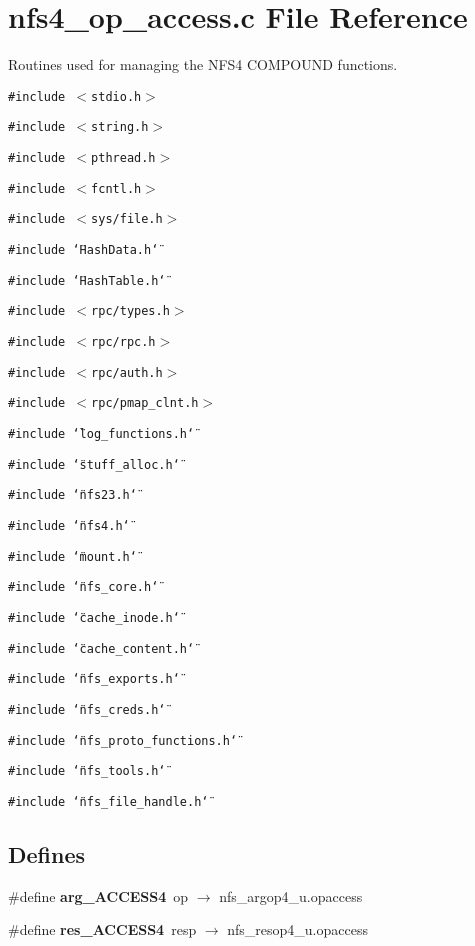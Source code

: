 \section{nfs4\_\-op\_\-access.c File Reference}
\label{nfs4__op__access_8c}
Routines used for managing the NFS4 COMPOUND functions. 

{\tt \#include $<$stdio.h$>$}\par
{\tt \#include $<$string.h$>$}\par
{\tt \#include $<$pthread.h$>$}\par
{\tt \#include $<$fcntl.h$>$}\par
{\tt \#include $<$sys/file.h$>$}\par
{\tt \#include \char`\"{}Hash\-Data.h\char`\"{}}\par
{\tt \#include \char`\"{}Hash\-Table.h\char`\"{}}\par
{\tt \#include $<$rpc/types.h$>$}\par
{\tt \#include $<$rpc/rpc.h$>$}\par
{\tt \#include $<$rpc/auth.h$>$}\par
{\tt \#include $<$rpc/pmap\_\-clnt.h$>$}\par
{\tt \#include \char`\"{}log\_\-functions.h\char`\"{}}\par
{\tt \#include \char`\"{}stuff\_\-alloc.h\char`\"{}}\par
{\tt \#include \char`\"{}nfs23.h\char`\"{}}\par
{\tt \#include \char`\"{}nfs4.h\char`\"{}}\par
{\tt \#include \char`\"{}mount.h\char`\"{}}\par
{\tt \#include \char`\"{}nfs\_\-core.h\char`\"{}}\par
{\tt \#include \char`\"{}cache\_\-inode.h\char`\"{}}\par
{\tt \#include \char`\"{}cache\_\-content.h\char`\"{}}\par
{\tt \#include \char`\"{}nfs\_\-exports.h\char`\"{}}\par
{\tt \#include \char`\"{}nfs\_\-creds.h\char`\"{}}\par
{\tt \#include \char`\"{}nfs\_\-proto\_\-functions.h\char`\"{}}\par
{\tt \#include \char`\"{}nfs\_\-tools.h\char`\"{}}\par
{\tt \#include \char`\"{}nfs\_\-file\_\-handle.h\char`\"{}}\par
\subsection*{Defines}
\begin{CompactItemize}
\item 
\#define {\bf arg\_\-ACCESS4}\ op $\rightarrow$ nfs\_\-argop4\_\-u.opaccess
\item 
\#define {\bf res\_\-ACCESS4}\ resp $\rightarrow$ nfs\_\-resop4\_\-u.opaccess
\end{CompactItemize}
